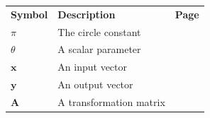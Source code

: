 \uestcsymbols

\begingroup
\renewcommand{\arraystretch}{1.3}
\setlength{\tabcolsep}{9pt}
\noindent
\begin{tabularx}{\linewidth}{%
    >{\normalsize}l
    >{\normalsize\raggedright\arraybackslash}X
    >{\normalsize}c}
    \textbf{Symbol} & \textbf{Description} & \textbf{Page} \\
    $\pi$ & The circle constant & \pageref{sym:math-symbols} \\
    $\theta$ & A scalar parameter & \pageref{sym:math-symbols} \\
    $\mathbf{x}$ & An input vector & \pageref{sym:math-symbols} \\
    $\mathbf{y}$ & An output vector & \pageref{sym:math-symbols} \\
    $\mathbf{A}$ & A transformation matrix & \pageref{sym:math-symbols} \\
\end{tabularx}
\par
\endgroup
